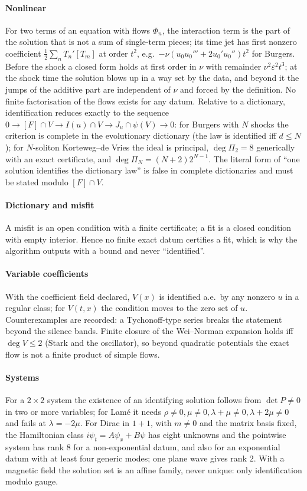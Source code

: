 \paragraph{Nonlinear} For two terms of an equation with flows $\Phi_n$, the interaction term is the part of the solution that is not a sum of single-term pieces; its time jet has first
nonzero coefficient $\tfrac12\sum_n T_n'[T_m]$ at order $t^2$, e.g.\ $-\nu(u_0u_0'''+2u_0'u_0'')t^2$ for Burgers. Before the shock a closed form holds at first order in $\nu$ with remainder $\nu^2\varepsilon^2t^3$; at the shock
time the solution blows up in a way set by the data, and beyond it the jumps of the additive part are independent of $\nu$ and forced by the definition. No finite factorisation of the flows exists for any datum. Relative to a dictionary, identification
reduces exactly to the sequence $0\to[F]\cap V\to I(u)\cap V\to J_u\cap\psi(V)\to0$: for Burgers with $N$ shocks the criterion is complete in the evolutionary dictionary (the law is identified iff $d\le N$); for $N$-soliton Korteweg--de Vries
the ideal is principal, $\deg\Pi_2=8$ generically with an exact certificate, and $\deg\Pi_N=(N+2)2^{N-1}$. The literal form of ``one solution identifies the dictionary law'' is false in complete dictionaries and must be stated modulo $[F]\cap V$.

\paragraph{Dictionary and misfit} A misfit is an open condition with a finite certificate; a fit is a closed condition with empty interior. Hence no finite exact datum certifies a fit, which is why the algorithm outputs \FC{} with a bound and never ``identified''.

\paragraph{Variable coefficients} With the coefficient field declared, $V(x)$ is identified a.e.\ by any nonzero $u$ in a regular class; for $V(t,x)$ the condition moves to the zero set of $u$.
Counterexamples are recorded: a Tychonoff-type series breaks the statement beyond the silence bands. Finite closure of the Wei--Norman expansion holds iff $\deg V\le2$ (Stark and the oscillator), so beyond quadratic potentials the exact flow is not a finite product of simple flows.

\paragraph{Systems} For a $2\times2$ system the existence of an identifying solution follows from $\det P\neq0$ in two or more variables; for Lam\'e it needs $\rho\neq0,\mu\neq0,\lambda+\mu\neq0,\lambda+2\mu\neq0$ and fails at $\lambda=-2\mu$. For Dirac in $1+1$, with $m\neq0$ and the matrix basis fixed, the Hamiltonian class
$i\psi_t=A\psi_x+B\psi$ has eight unknowns and the pointwise system has rank $8$ for a non-exponential datum, and also for an exponential datum with at least four generic modes; one plane wave gives rank $2$.
With a magnetic field the solution set is an affine family, never unique: only identification modulo gauge.

